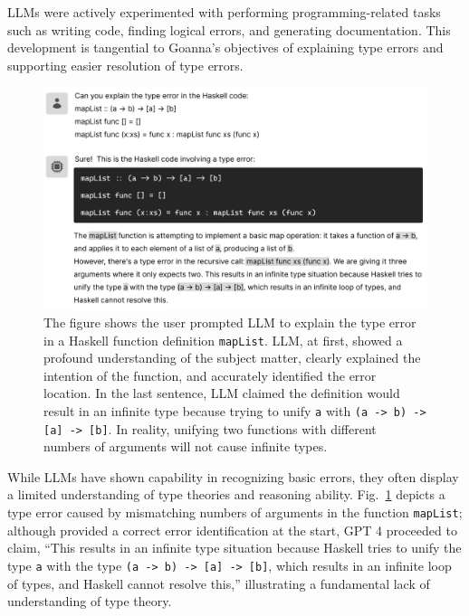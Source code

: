 \documentclass[pdflatex,lineno,sn-nature,Numbered]{sn-jnl}%
\begin{document}
LLMs were actively experimented with performing programming-related tasks such as writing code, finding logical errors, and generating documentation.  This development is tangential to Goanna's objectives of explaining type errors and supporting easier resolution of type errors. 

\begin{figure}[hbt]
  \includegraphics[width=\linewidth]{images/LLM.pdf}
  \caption[LLM explaining a type error; it began very accurate, then went on to give incorrect and contradicting analysis]{\label{fig:llm}
  The figure shows the user prompted LLM to explain the type error in a Haskell function definition \texttt{mapList}. LLM, at first, showed a profound understanding of the subject matter, clearly explained the intention of the function, and accurately identified the error location. In the last sentence, LLM claimed the definition would result in an infinite type because trying to unify \texttt{a} with \texttt{(a -> b) -> [a] -> [b]}. In reality, unifying two functions with different numbers of arguments will not cause infinite types. 
    }
\end{figure}

While LLMs have shown capability in recognizing basic errors, they often display a limited understanding of type theories and reasoning ability. Fig.~\ref{fig:llm} depicts a type error caused by mismatching numbers of arguments in the function \texttt{mapList}; although provided a correct error identification at the start, GPT 4 proceeded to claim, “This results in an infinite type situation because Haskell tries to unify the type \texttt{a} with the type \texttt{(a -> b) -> [a] -> [b]}, which results in an infinite loop of types, and Haskell cannot resolve this,” illustrating a fundamental lack of understanding of type theory.
\end{document}
